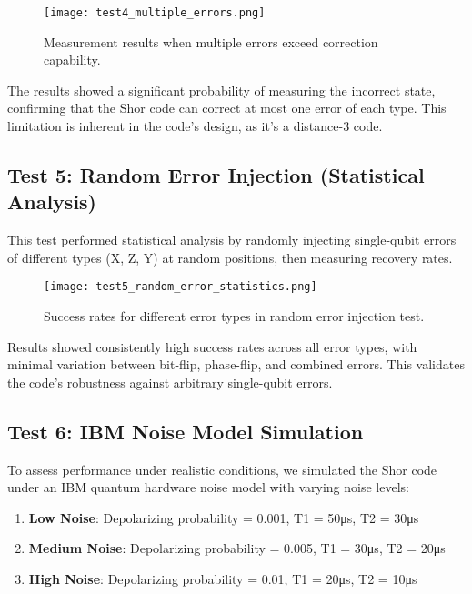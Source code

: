 \documentclass[12pt,a4paper]{article}
\begin{document}
\begin{figure}[H]
    \centering
    \texttt{[image: test4\_multiple\_errors.png]}
    \caption{Measurement results when multiple errors exceed correction capability.}
    \label{fig:multiple_errors_results}
\end{figure}

The results showed a significant probability of measuring the incorrect state, confirming that the Shor code can correct at most one error of each type. This limitation is inherent in the code's design, as it's a distance-3 code.

\subsection{Test 5: Random Error Injection (Statistical Analysis)}

This test performed statistical analysis by randomly injecting single-qubit errors of different types (X, Z, Y) at random positions, then measuring recovery rates.

\begin{figure}[H]
    \centering
    \texttt{[image: test5\_random\_error\_statistics.png]}
    \caption{Success rates for different error types in random error injection test.}
    \label{fig:random_error_stats}
\end{figure}

Results showed consistently high success rates across all error types, with minimal variation between bit-flip, phase-flip, and combined errors. This validates the code's robustness against arbitrary single-qubit errors.

\subsection{Test 6: IBM Noise Model Simulation}

To assess performance under realistic conditions, we simulated the Shor code under an IBM quantum hardware noise model with varying noise levels:

\begin{enumerate}
    \item \textbf{Low Noise}: Depolarizing probability = 0.001, T1 = 50μs, T2 = 30μs
    \item \textbf{Medium Noise}: Depolarizing probability = 0.005, T1 = 30μs, T2 = 20μs
    \item \textbf{High Noise}: Depolarizing probability = 0.01, T1 = 20μs, T2 = 10μs
\end{enumerate}
\end{document}
